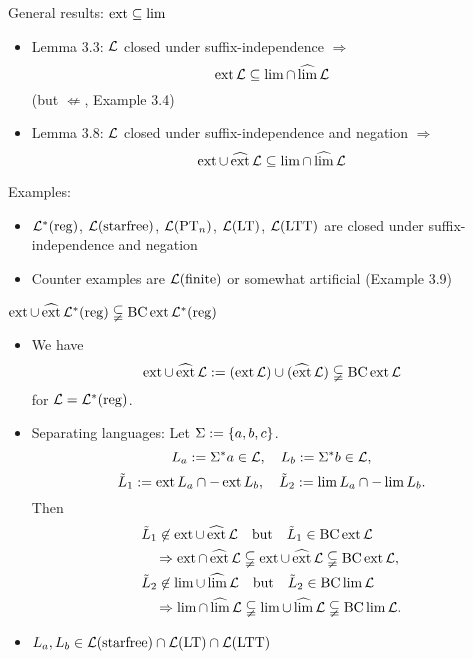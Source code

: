 \documentclass[
	notheorems,noamsthm]{beamer}
\begin{document}
\begin{frame}[<+->]{General results: $\operatorname{ext} \subseteq \lim$}
\begin{itemize}
\item Lemma 3.3: $\mathcal{L}$ closed under suffix-independence $\Rightarrow$
\[ \operatorname{ext} \mathcal{L} \subseteq \lim \cap \operatorname{\widehat{lim}} \mathcal{L} \]
(but $\not\Leftarrow$, Example 3.4)
\item Lemma 3.8: $\mathcal{L}$ closed under suffix-independence and negation $\Rightarrow$
\[ \operatorname{ext} \cup \operatorname{\widehat{ext}} \mathcal{L} \subseteq \lim \cap \operatorname{\widehat{lim}} \mathcal{L} \]
\end{itemize}
Examples:
\begin{itemize}
\item $\mathcal{L}^*(\textup{\textrm{reg}})$, $\mathcal{L}(\textup{\textrm{starfree}})$, $\mathcal{L}(\textup{\textrm{PT}}_n)$, $\mathcal{L}(\textup{\textrm{LT}})$, $\mathcal{L}(\textup{\textrm{LTT}})$ are closed under suffix-independence and negation
\item Counter examples are $\mathcal{L}(\textup{\textrm{finite}})$ or somewhat artificial (Example 3.9)
\end{itemize}
\end{frame}

\begin{frame}[<+->]{$\operatorname{ext} \cup \operatorname{\widehat{ext}} \mathcal{L}^*(\textup{\textrm{reg}}) \subsetneqq \operatorname{BC} \operatorname{ext} \mathcal{L}^*(\textup{\textrm{reg}})$}
\begin{itemize}
\item
We have
\[ \operatorname{ext} \cup \operatorname{\widehat{ext}} \mathcal{L} := (\operatorname{ext} \mathcal{L}) \cup (\operatorname{\widehat{ext}} \mathcal{L}) \subsetneqq \operatorname{BC} \operatorname{ext} \mathcal{L} \]
for $\mathcal{L} = \mathcal{L}^*(\textup{\textrm{reg}})$.

\item
Separating languages: Let $\Sigma := \Set{a,b,c}$.
\[ L_a := \Sigma^* a \in \mathcal{L}, \ \ \ L_b := \Sigma^* b \in \mathcal{L}, \]
\[ \tilde L_1 := \ext L_a \cap -\ext L_b, \ \ \ \tilde L_2 := \lim L_a \cap -\lim L_b . \]
Then
\begin{align*}
& \tilde L_1 \not\in \ext \cup \dext \Lang \ \ \text{ but } \ \ \tilde L_1 \in \BC \ext \Lang \\ 
& \ \ \ \Rightarrow \ext \cap \dext \Lang \subsetneqq \ext \cup \dext \Lang \subsetneqq \BC \ext \Lang , \\
& \tilde L_2 \not\in \lim \cup \dlim \Lang \ \ \text{ but } \ \ \tilde L_2 \in \BC \lim \Lang \\
& \ \ \ \Rightarrow \lim \cap \dlim \Lang \subsetneqq \lim \cup \dlim \Lang \subsetneqq \BC \lim \Lang .
\end{align*}

\item
$L_a,L_b \in \mathcal{L}(\textup{\textrm{starfree}}) \cap \mathcal{L}(\textup{\textrm{LT}}) \cap \mathcal{L}(\textup{\textrm{LTT}})$
\end{itemize}
\end{frame}
\end{document}

